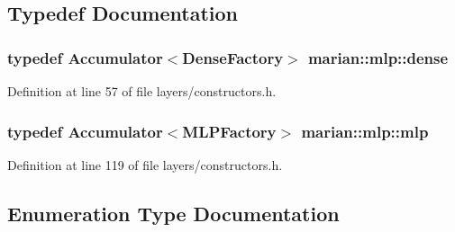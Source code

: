 \subsection{Typedef Documentation}
\subsubsection[{\texorpdfstring{dense}{dense}}]{\setlength{\rightskip}{0pt plus 5cm}typedef {\bf Accumulator}$<${\bf Dense\+Factory}$>$ {\bf marian\+::mlp\+::dense}}\hypertarget{namespacemarian_1_1mlp_a8c25b1e343bf78e66cd9e33e607efeb5}{}\label{namespacemarian_1_1mlp_a8c25b1e343bf78e66cd9e33e607efeb5}


Definition at line 57 of file layers/constructors.\+h.

\subsubsection[{\texorpdfstring{mlp}{mlp}}]{\setlength{\rightskip}{0pt plus 5cm}typedef {\bf Accumulator}$<${\bf M\+L\+P\+Factory}$>$ {\bf marian\+::mlp\+::mlp}}\hypertarget{namespacemarian_1_1mlp_a4d0fe240d31bdc33bcbdb5401de49e27}{}\label{namespacemarian_1_1mlp_a4d0fe240d31bdc33bcbdb5401de49e27}


Definition at line 119 of file layers/constructors.\+h.



\subsection{Enumeration Type Documentation}
